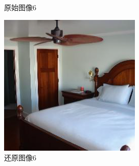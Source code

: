 \begin{figure}[H]
\begin{minipage}[b]{0.3\linewidth}
    \caption{原始图像6}
    \label{original image 6}
  \end{minipage}
\hspace{0.1cm}
  \begin{minipage}[b]{0.3\linewidth}
    \includegraphics[width=\linewidth]{Picture/recon/00008.png}
    \caption{还原图像6}
    \label{inpainted image 6}
  \end{minipage}
  \label{整块损坏图像}
\end{figure}


